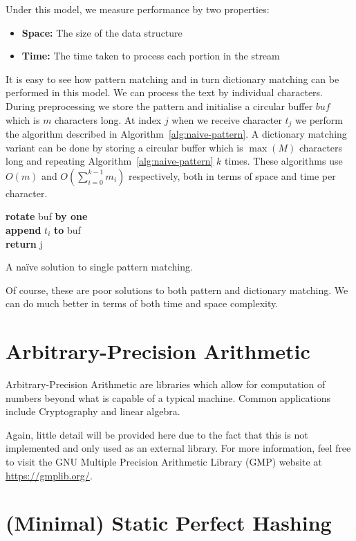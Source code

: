 \documentclass[ %
                    author={Dominic Joseph Moylett},
                    degree={MEng},
                     title={Dictionary Matching with Fingerprints},
                  subtitle={An Empirical Analysis},
                      type={Research},
                      year={2014} ]{dissertation}
\begin{document}
Under this model, we measure performance by two properties:
\begin{itemize}
  \item {\bf Space:} The size of the data structure
  \item {\bf Time:} The time taken to process each portion in the stream
\end{itemize}

It is easy to see how pattern matching and in turn dictionary matching can be performed in this model. We can process the text by individual characters. During preprocessing we store the pattern and initialise a circular buffer $buf$ which is $m$ characters long. At index $j$ when we receive character $t_j$ we perform the algorithm described in Algorithm~\ref{alg:naive-pattern}. A dictionary matching variant can be done by storing a circular buffer which is $\max(M)$ characters long and repeating Algorithm~\ref{alg:naive-pattern} $k$ times. These algorithms use $O(m)$ and $O(\sum^{k-1}_{i=0}m_i)$ respectively, both in terms of space and time per character.

\begin{algorithm}[t]
{\bf rotate} buf {\bf by one}\\
{\bf append} $t_i$ {\bf to} buf\\
{\bf return} j
\caption{A na\"{i}ve solution to single pattern matching.}
\label{alg:naive-pattern}
\end{algorithm}

Of course, these are poor solutions to both pattern and dictionary matching. We can do much better in terms of both time and space complexity.

\section{Arbitrary-Precision Arithmetic}

Arbitrary-Precision Arithmetic are libraries which allow for computation of numbers beyond what is capable of a typical machine. Common applications include Cryptography and linear algebra.

Again, little detail will be provided here due to the fact that this is not implemented and only used as an external library. For more information, feel free to visit the GNU Multiple Precision Arithmetic Library (GMP) website at \url{https://gmplib.org/}.

\section{(Minimal) Static Perfect Hashing}
\label{min-perf-hash}
\end{document}
